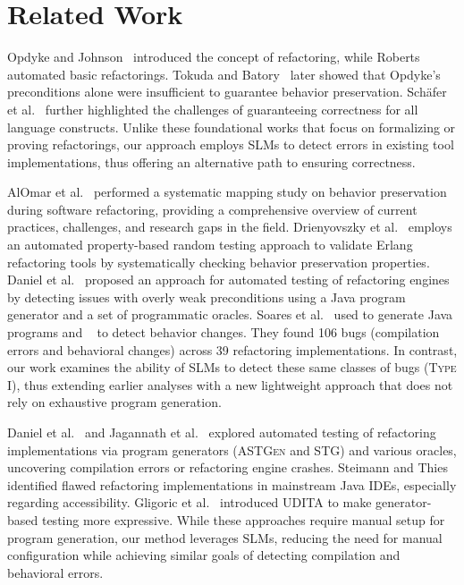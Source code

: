 \section{Related Work}
\label{sec:relwork}

Opdyke and Johnson~\cite{Opdyke-SOOPPA-1990,Opdyke-PHD-1992} introduced the concept of refactoring, while Roberts~\cite{Roberts-PHD-1999} automated basic refactorings. Tokuda and Batory~\cite{Tokuda-ASE-2001} later showed that Opdyke’s preconditions alone were insufficient to guarantee behavior preservation. Sch\"{a}fer et al.~\cite{Schafer-PLPV-2009} further highlighted the challenges of guaranteeing correctness for all language constructs. 
Unlike these foundational works that focus on formalizing or proving refactorings, our approach employs SLMs to detect errors in existing tool implementations, thus offering an alternative path to ensuring correctness.

AlOmar et al.~\cite{DBLP:journals/infsof/AlOmarMNO21} performed a systematic mapping study on behavior preservation during software refactoring, providing a comprehensive overview of current practices, challenges, and research gaps in the field.
Drienyovszky et al.~\cite{quickcheck-erlang} employs an automated property-based random testing approach to validate Erlang refactoring tools by systematically checking behavior preservation properties.
Daniel et al.~\cite{test-tools-fse07} proposed an approach for automated testing of refactoring engines by detecting issues with overly weak preconditions using a Java program generator and a set of programmatic oracles. 
Soares et al.~\cite{Soares-TSE-2013} used \jdolly{} to generate Java programs and \saferefactor{}~\cite{saferefactor-ieee} to detect behavior changes. They found 106 bugs (compilation errors and behavioral changes) across 39 refactoring implementations. 
In contrast, our work examines the ability of SLMs to detect these same classes of bugs (\textsc{Type I}), thus extending earlier analyses with a new lightweight approach that does not rely on exhaustive program generation.

Daniel et al.~\cite{daniel-fse-07} and Jagannath et al.~\cite{Jagannath-FASE-2009} explored automated testing of refactoring implementations via program generators (\textsc{ASTGen} and STG) and various oracles, uncovering compilation errors or refactoring engine crashes. Steimann and Thies~\cite{steimann-ecoop} identified flawed refactoring implementations in mainstream Java IDEs, especially regarding accessibility. Gligoric et al.~\cite{Gligoric-ICSE-2010} introduced \textsc{UDITA} to make generator-based testing more expressive. 
While these approaches require manual setup for program generation, our method leverages SLMs, reducing the need for manual configuration while achieving similar goals of detecting compilation and behavioral errors.

